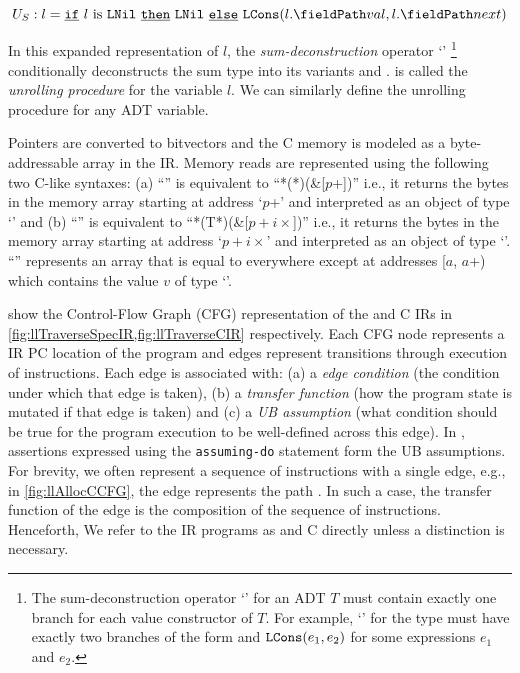 \begin{equation}
\label{eqn:specDeconstruct}
U_S: l = \sumIf{\sumIs{l}{LNil}} \  \sumThen{\cons{LNil}} \  \sumElse{\cons{LCons}(\prodAccess{l}{val}, \prodAccess{l}{next})}
\end{equation}

In this expanded representation of $l$,
the {\em sum-deconstruction} operator `\sumDtor{}'
\footnote{The sum-deconstruction operator `\sumDtor{}' for an ADT
$T$ must contain exactly one branch for each value constructor of $T$.
For example, `\sumDtor{}' for the  type must have exactly two branches
of the form  and ${\tt LCons}(e_1,e_2)$ for some expressions $e_1$ and $e_2$.}
conditionally deconstructs the sum type into its variants  and .
 is called the {\em unrolling procedure} for the  variable $l$.
We can similarly define the unrolling procedure for any ADT variable.

Pointers are converted to bitvectors and the C memory 
is modeled as a byte-addressable array \mem{} in the IR.
Memory reads are represented using the following two C-like syntaxes:
(a) ``'' is equivalent to ``*(*)(\&\mem{}[$p$+])''
i.e., it returns the bytes in the memory array \mem{} starting at address `$p$+'
and interpreted as an object of type `' and
(b) ``'' is equivalent to ``*(T*)(\&\mem{}[$p+i\times$])''
i.e., it returns the bytes in the memory array \mem{} starting at address `$p+i\times$'
and interpreted as an object of type `'.
``'' represents an array that is equal to \mem{} everywhere except at addresses
[$a$, $a$+) which contains the value $v$ of type `'.

 show the Control-Flow Graph (CFG) representation
of the \SpecL{} and C IRs in \cref{fig:llTraverseSpecIR,fig:llTraverseCIR} respectively.
Each CFG node represents a IR PC location of the program and edges represent
transitions through execution of instructions.
Each edge is associated with:
(a) a {\em edge condition} (the condition under which that edge is taken),
(b) a {\em transfer function} (how the program state is mutated if that edge is taken) and
(c) a {\em UB assumption} (what condition should be true for the program execution
to be well-defined across this edge).
In \SpecL{}, assertions expressed using the {\tt assuming-do} statement
form the UB assumptions.
For brevity, we often represent a sequence of instructions with a single edge, e.g.,
in \cref{fig:llAllocCCFG}, the edge  represents the path .
In such a case, the transfer function of the edge is the composition of the sequence of instructions.
Henceforth, We refer to the IR programs as \SpecL{} and C directly unless a distinction is necessary.

